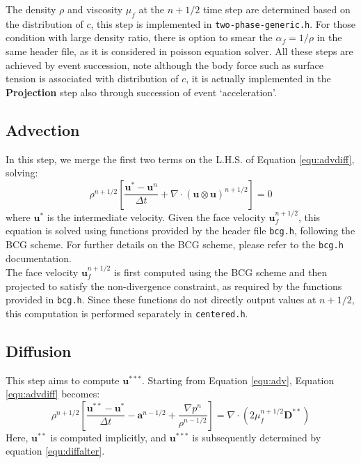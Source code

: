 \documentclass[a4paper]{article}
\begin{document}
The density $\rho$ and viscosity $\mu_f$ at the $n+1/2$ time step are determined based on the distribution of $c$, this step is implemented in \texttt{two-phase-generic.h}. For those condition with large density ratio, there is option to smear the $\alpha_f=1/\rho$ in the same header file, as it is considered in poisson equation solver. All these steps are achieved by event succession, note although the body force such as surface tension is associated with distribution of $c$, it is actually implemented in the \textbf{Projection} step also through succession of event `acceleration'.
\subsection{Advection}

In this step, we merge the first two terms on the L.H.S. of Equation \ref{equ:advdiff}, solving:  
\begin{equation}
    \rho^{n+1/2}\left[\frac{\mathbf{u}^* - \mathbf{u}^n}{\Delta t} + \nabla\cdot(\mathbf{u}\otimes\mathbf{u})^{n+1/2}\right] = 0\label{equ:adv}
\end{equation}  
where $\mathbf{u}^*$ is the intermediate velocity. Given the face velocity $\mathbf{u}^{n+1/2}_f$, this equation is solved using functions provided by the header file \texttt{bcg.h}, following the BCG scheme.  For further details on the BCG scheme, please refer to the \texttt{bcg.h} documentation.\\
The face velocity $\mathbf{u}^{n+1/2}_f$ is first computed using the BCG scheme and then projected to satisfy the non-divergence constraint, as required by the functions provided in \texttt{bcg.h}. Since these functions do not directly output values at $n+1/2$, this computation is performed separately in \texttt{centered.h}.\\

\subsection{Diffusion}
This step aims to compute $\mathbf{u}^{***}$.  
Starting from Equation \ref{equ:adv}, Equation \ref{equ:advdiff} becomes:  
\begin{equation}
    \rho^{n+1/2} \left[ \frac{\mathbf{u}^{**} - \mathbf{u}^*}{\Delta t}  
    - \mathbf{a}^{n-1/2} 
    + \frac{\nabla p^n}{\rho^{n-1/2}} \right] 
    = \nabla \cdot \left( 2\mu^{n+1/2}_f \mathbf{D}^{**} \right)\label{equ:diff}
\end{equation}  
Here, $\mathbf{u}^{**}$ is computed implicitly, and $\mathbf{u}^{***}$ is subsequently determined by equation \ref{equ:diffalter}.
\end{document}
